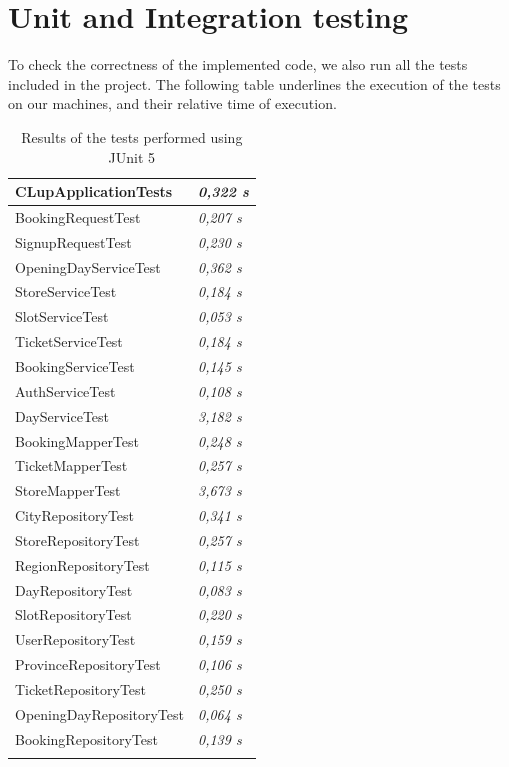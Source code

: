 \documentclass[a4paper,oneside,11pt]{book}
\begin{document}
    \section{Unit and Integration testing}
    To check the correctness of the implemented code, we also run all the tests included in the project. The following table underlines the execution of the tests on our machines, and their relative time of execution.
    \begin{longtable}[c] { |H{0.55\textwidth}|>{\em}C{0.15\textwidth}| }
        \hline
        CLupApplicationTests & 0,322 s \\ \hline
        BookingRequestTest & 0,207 s\\ \hline
        SignupRequestTest & 0,230 s\\ \hline
        OpeningDayServiceTest & 0,362 s\\ \hline
        StoreServiceTest & 0,184 s\\ \hline
        SlotServiceTest & 0,053 s\\ \hline
        TicketServiceTest & 0,184 s\\ \hline
        BookingServiceTest & 0,145 s\\ \hline
        AuthServiceTest & 0,108 s\\ \hline
        DayServiceTest & 3,182 s\\ \hline
        BookingMapperTest & 0,248 s\\ \hline
        TicketMapperTest & 0,257 s\\ \hline
        StoreMapperTest & 3,673 s\\ \hline
        CityRepositoryTest & 0,341 s\\ \hline
        StoreRepositoryTest & 0,257 s\\ \hline
        RegionRepositoryTest & 0,115 s\\ \hline
        DayRepositoryTest & 0,083 s\\ \hline
        SlotRepositoryTest & 0,220 s\\ \hline
        UserRepositoryTest & 0,159 s\\ \hline
        ProvinceRepositoryTest & 0,106 s\\ \hline
        TicketRepositoryTest & 0,250 s\\ \hline
        OpeningDayRepositoryTest & 0,064 s\\ \hline
        BookingRepositoryTest & 0,139 s\\ \hline
    \caption{Results of the tests performed using JUnit 5}
    \label{table:tests}
    \end{longtable}
    
\end{document}
